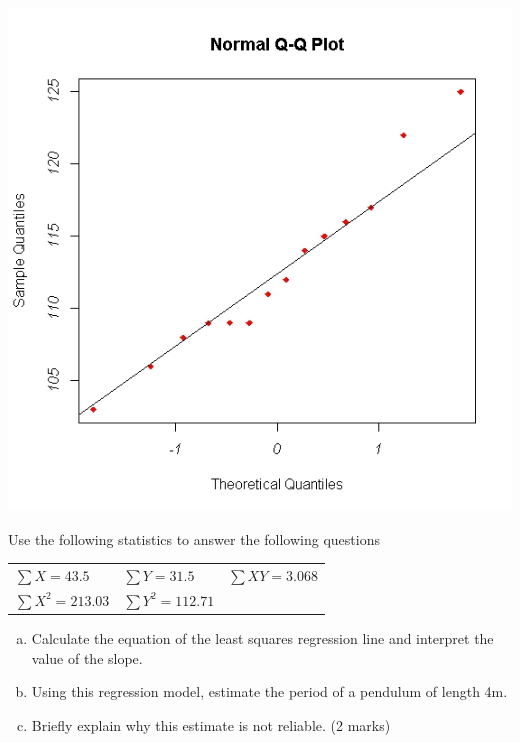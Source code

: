 \documentclass[a4paper,12pt]{article}
\begin{document}
\begin{enumerate}

\begin{center}
\includegraphics[scale=0.55]{images/Q5examQQplot.jpeg}
\end{center}
Use the following statistics to answer the following questions

\begin{center}
\begin{tabular}{lll}
  $\sum X = 43.5$ & $\sum Y = 31.5$ & $\sum XY = 3.068$ \\
  $\sum X^2 = 213.03$ & $\sum Y^2 = 112.71$ &  \\
 \end{tabular}
 \end{center}
 
 \begin{enumerate}[(a)]
     \item Calculate the equation of the least squares regression line and interpret the value of the slope.
\item Using this regression model, estimate the period of a pendulum of length 4m.
\item Briefly explain why this estimate is not reliable.
(2 marks)
 \end{enumerate}



\end{enumerate}
\end{document}
